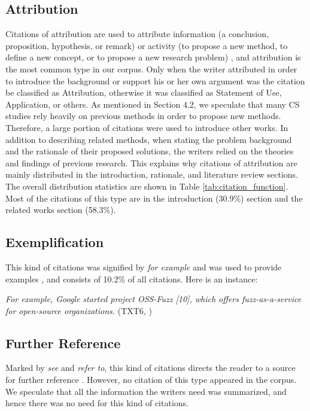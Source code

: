 \subsection{Attribution}
Citations of attribution are used to attribute information (a conclusion, proposition, hypothesis, or remark) or activity (to propose a new method, to define a new concept, or to propose a new research problem) \citep{petric_rhetorical_2007}, and attribution is the most common type in our corpus. Only when the writer attributed in order to introduce the background or support his or her own argument was the citation be classified as Attribution, otherwise it was classified as Statement of Use, Application, or others. As mentioned in Section 4.2, we speculate that many CS studies rely heavily on previous methods in order to propose new methods. Therefore, a large portion of citations were used to introduce other works. In addition to describing related methods, when stating the problem background and the rationale of their proposed solutions, the writers relied on the theories and findings of previous research. This explains why citations of attribution are mainly distributed in the introduction, rationale, and literature review sections. The overall distribution statistics are shown in Table \ref{tab:citation_function}. Most of the citations of this type are in the introduction (30.9\%) section and the related works section (58.3\%).

\subsection{Exemplification}
This kind of citations was signified by \textit{for example} and was used to provide examples \citep{petric_rhetorical_2007}, and consists of 10.2\% of all citations. Here is an instance:

\textit{For example, Google started project OSS-Fuzz [10], which offers fuzz-as-a-service for open-source organizations.} (TXT6, \citealp{liang_fuzz_2018})

\subsection{Further Reference}
Marked by \textit{see} and \textit{refer to}, this kind of citations directs the reader to a source for further reference \citep{petric_rhetorical_2007}. However, no citation of this type appeared in the corpus. We speculate that all the information the writers need was summarized, and hence there was no need for this kind of citations.


